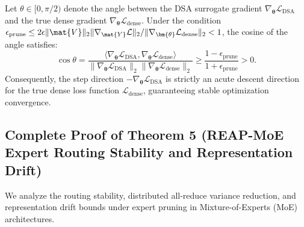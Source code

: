 \begin{corollary}
\label{cor:dsa_gradient_angle}
Let $\theta \in [0, \pi/2)$ denote the angle between the DSA surrogate gradient $\nabla_{\bm{\theta}} \mathcal{L}_{\text{DSA}}$ and the true dense gradient $\nabla_{\bm{\theta}} \mathcal{L}_{\text{dense}}$.
Under the condition $\epsilon_{\text{prune}} \le 2 \epsilon \|\mat{V}\|_2 \|\nabla_{\mat{Y}} \mathcal{L}\|_2 / \|\nabla_{\bm{\theta}} \mathcal{L}_{\text{dense}}\|_2 < 1$, the cosine of the angle satisfies:
\begin{equation}
\cos \theta = \frac{\langle \nabla_{\bm{\theta}} \mathcal{L}_{\text{DSA}}, \nabla_{\bm{\theta}} \mathcal{L}_{\text{dense}} \rangle}{\|\nabla_{\bm{\theta}} \mathcal{L}_{\text{DSA}}\|_2 \|\nabla_{\bm{\theta}} \mathcal{L}_{\text{dense}}\|_2} \ge \frac{1 - \epsilon_{\text{prune}}}{1 + \epsilon_{\text{prune}}} > 0.
\label{eq:dsa_cos_theta_bound}
\end{equation}
Consequently, the step direction $-\nabla_{\bm{\theta}} \mathcal{L}_{\text{DSA}}$ is strictly an acute descent direction for the true dense loss function $\mathcal{L}_{\text{dense}}$, guaranteeing stable optimization convergence.
\end{corollary}

\subsection{Complete Proof of Theorem 5 (REAP-MoE Expert Routing Stability and Representation Drift)}
\label{sec:appendix_a5_thm5}

We analyze the routing stability, distributed all-reduce variance reduction, and representation drift bounds under expert pruning in Mixture-of-Experts (MoE) architectures.

